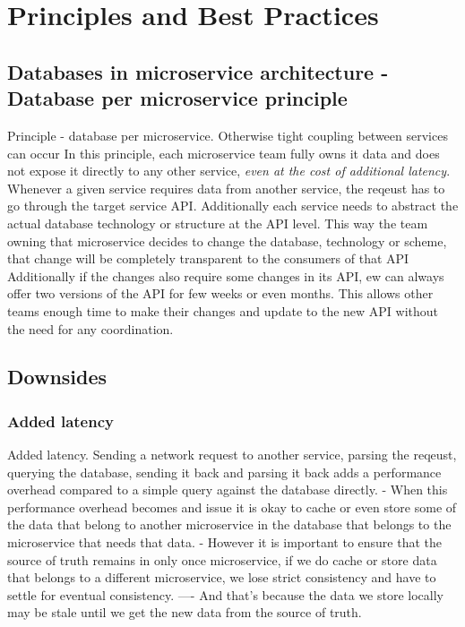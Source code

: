 \section{Principles and Best Practices}

\subsection{Databases in microservice architecture - Database per microservice principle}
Principle - database per microservice. Otherwise tight coupling between services can occur
In this principle, each microservice team fully owns it data and does not expose it directly to any other service, \textit{even at the cost of additional latency}.
Whenever a given service requires data from another service, the reqeust has to go through the target service API.
Additionally each service needs to abstract the actual database technology or structure at the API level.
This way the team owning that microservice decides to change the database, technology or scheme, that change will be completely transparent to the consumers of that API
Additionally if the changes also require some changes in its API, ew can always offer two versions of the API for few weeks or even months.
This allows other teams enough time to make their changes and update to the new API without the need for any coordination.

\subsection{Downsides}

\subsubsection{Added latency}
Added latency.
Sending a network request to another service, parsing the reqeust, querying the database, sending it back and parsing it back
adds a performance overhead compared to a simple query against the database directly.
- When this performance overhead becomes and issue it is okay to cache or even store some of the data that belong to another microservice in the database that belongs to the microservice that needs that data.
- However it is important to ensure that the source of truth remains in only once microservice, if we do cache or store data that belongs to a different microservice, we lose strict consistency and have to settle for eventual consistency.
---- And that's because the data we store locally may be stale until we get the new data from the source of truth.

